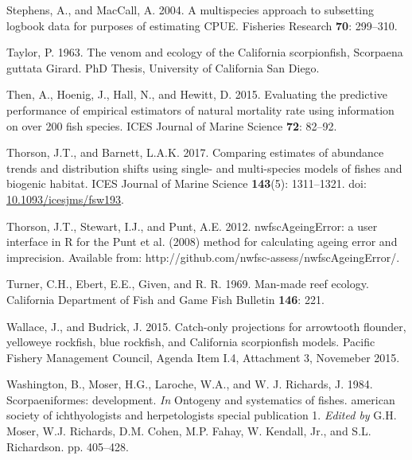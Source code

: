 \documentclass[12pt,]{article}
\begin{document}
\hypertarget{ref-Stephens2004}{}
Stephens, A., and MacCall, A. 2004. A multispecies approach to
subsetting logbook data for purposes of estimating CPUE. Fisheries
Research \textbf{70}: 299--310.

\hypertarget{ref-Taylor1963}{}
Taylor, P. 1963. The venom and ecology of the California scorpionfish,
Scorpaena guttata Girard. PhD Thesis, University of California San
Diego.

\hypertarget{ref-Then2015}{}
Then, A., Hoenig, J., Hall, N., and Hewitt, D. 2015. Evaluating the
predictive performance of empirical estimators of natural mortality rate
using information on over 200 fish species. ICES Journal of Marine
Science \textbf{72}: 82--92.

\hypertarget{ref-Thorson2017}{}
Thorson, J.T., and Barnett, L.A.K. 2017. Comparing estimates of
abundance trends and distribution shifts using single- and multi-species
models of fishes and biogenic habitat. ICES Journal of Marine Science
\textbf{143}(5): 1311--1321. doi:
\href{https://doi.org/10.1093/icesjms/fsw193}{10.1093/icesjms/fsw193}.

\hypertarget{ref-Thorson2012}{}
Thorson, J.T., Stewart, I.J., and Punt, A.E. 2012. nwfscAgeingError: a
user interface in R for the Punt et al. (2008) method for calculating
ageing error and imprecision. Available from:
http://github.com/nwfsc-assess/nwfscAgeingError/.

\hypertarget{ref-Turner1969}{}
Turner, C.H., Ebert, E.E., Given, and R. R. 1969. Man-made reef ecology.
California Department of Fish and Game Fish Bulletin \textbf{146}: 221.

\hypertarget{ref-Wallace2015}{}
Wallace, J., and Budrick, J. 2015. Catch-only projections for arrowtooth
flounder, yelloweye rockfish, blue rockfish, and California scorpionfish
models. Pacific Fishery Management Council, Agenda Item I.4, Attachment
3, Novemeber 2015.

\hypertarget{ref-Washington1984}{}
Washington, B., Moser, H.G., Laroche, W.A., and W. J. Richards, J. 1984.
Scorpaeniformes: development. \emph{In} Ontogeny and systematics of
fishes. american society of ichthyologists and herpetologists special
publication 1. \emph{Edited by} G.H. Moser, W.J. Richards, D.M. Cohen,
M.P. Fahay, W. Kendall, Jr., and S.L. Richardson. pp. 405--428.
\end{document}
